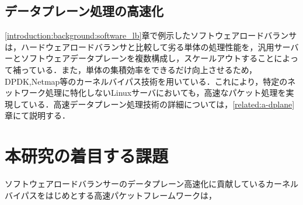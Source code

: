\subsection{データプレーン処理の高速化}
\ref{introduction:background:software_lb}章で例示したソフトウェアロードバランサは，ハードウェアロードバランサと比較して劣る単体の処理性能を，汎用サーバーとソフトウェアデータプレーンを複数構成し，スケールアウトすることによって補っている．また，単体の集積効率をできるだけ向上させるため，DPDK\cite{DPDK},Netmap\cite{netmap}等のカーネルバイパス技術を用いている．これにより，特定のネットワーク処理に特化しないLinuxサーバにおいても，高速なパケット処理を実現している．高速データプレーン処理技術の詳細については，\ref{related:a-dplane}章にて説明する．


\section{本研究の着目する課題}
ソフトウェアロードバランサーのデータプレーン高速化に貢献しているカーネルバイパスをはじめとする高速パケットフレームワークは，








